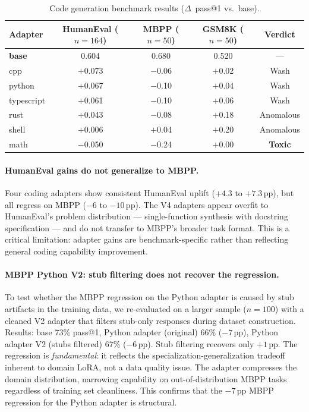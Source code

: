 \documentclass[11pt,a4paper]{article}
\begin{document}
\begin{table}[h]
\centering
\caption{Code generation benchmark results ($\Delta$~pass@1 vs.\ base).}
\label{tab:benchmarks}
\begin{tabular}{lcccc}
\toprule
\textbf{Adapter} & \textbf{HumanEval} ($n{=}164$) & \textbf{MBPP} ($n{=}50$) & \textbf{GSM8K} ($n{=}50$) & \textbf{Verdict} \\
\midrule
\textbf{base} & 0.604 & 0.680 & 0.520 & --- \\
cpp & $+$0.073 & $-$0.06 & $+$0.02 & Wash \\
python & $+$0.067 & $-$0.10 & $+$0.04 & Wash \\
typescript & $+$0.061 & $-$0.10 & $+$0.06 & Wash \\
rust & $+$0.043 & $-$0.08 & $+$0.18 & Anomalous \\
shell & $+$0.006 & $+$0.04 & $+$0.20 & Anomalous \\
math & $-$0.050 & $-$0.24 & $+$0.00 & \textbf{Toxic} \\
\bottomrule
\end{tabular}
\end{table}

\paragraph{HumanEval gains do not generalize to MBPP.}
Four coding adapters show consistent HumanEval uplift ($+4.3$ to $+7.3$\,pp), but all regress on MBPP ($-6$ to $-10$\,pp). The V4 adapters appear overfit to HumanEval's problem distribution --- single-function synthesis with docstring specification --- and do not transfer to MBPP's broader task format. This is a critical limitation: adapter gains are benchmark-specific rather than reflecting general coding capability improvement.

\paragraph{MBPP Python V2: stub filtering does not recover the regression.}
To test whether the MBPP regression on the Python adapter is caused by stub artifacts in the training data, we re-evaluated on a larger sample ($n{=}100$) with a cleaned V2 adapter that filters stub-only responses during dataset construction. Results: base 73\% pass@1, Python adapter (original) 66\% ($-7$\,pp), Python adapter V2 (stubs filtered) 67\% ($-6$\,pp). Stub filtering recovers only $+1$\,pp. The regression is \emph{fundamental}: it reflects the specialization-generalization tradeoff inherent to domain LoRA, not a data quality issue. The adapter compresses the domain distribution, narrowing capability on out-of-distribution MBPP tasks regardless of training set cleanliness. This confirms that the $-7$\,pp MBPP regression for the Python adapter is structural.
\end{document}
